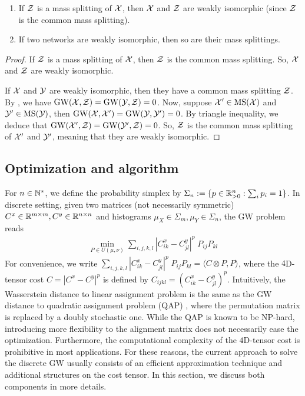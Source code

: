 \begin{corollary}
  \text{ }
\begin{enumerate}
  \item If $\mathcal Z$ is a mass splitting of $\mathcal X$, then $\mathcal X$ and $\mathcal Z$ are weakly isomorphic
  (since $\mathcal Z$ is the common mass splitting).
  \item If two networks are weakly isomorphic, then so are their mass splittings.
\end{enumerate}
\end{corollary}
\begin{proof}
  If $\mathcal Z$ is a mass splitting of $\mathcal X$, then $\mathcal Z$ is the common mass splitting.
  So, $\mathcal X$ and $\mathcal Z$ are weakly isomorphic.

  If $\mathcal X$ and $\mathcal Y$ are weakly isomorphic, then they have a common mass splitting $\mathcal Z$.
  By , we have $\text{GW}(\mathcal X, \mathcal Z) = \text{GW}(\mathcal Y, \mathcal Z) = 0$.
  Now, suppose $\mathcal X' \in \text{MS}(\mathcal X)$ and $\mathcal Y' \in \text{MS}(\mathcal Y)$, then
  $\text{GW}(\mathcal X, \mathcal X') = \text{GW}(\mathcal Y, \mathcal Y') = 0$. By triangle inequality, we deduce that
  $\text{GW}(\mathcal X', \mathcal Z) = \text{GW}(\mathcal Y', \mathcal Z) = 0$. So, $\mathcal Z$ is the common mass splitting
  of $\mathcal X'$ and $\mathcal Y'$, meaning that they are weakly isomorphic.
\end{proof}

\subsection{Optimization and algorithm}
For $n \in \mathbb N^*$, we define the probability simplex by
$\Sigma_n := \{ p \in \mathbb R^n_{> 0}: \sum_i p_i = 1 \}$.
In discrete setting, given two matrices (not necessarily symmetric)
$C^x \in \mathbb R^{m \times m}, C^y \in \mathbb R^{n \times n}$ and histograms
$\mu_X \in \Sigma_m, \mu_Y \in \Sigma_n$, the GW problem reads
\begin{align}
  \label{eq:discrete_gw}
  \min_{P \in U(\mu, \nu)} \sum_{i,j,k,l} |C^x_{ik} - C^y_{jl}|^p \; P_{ij} P_{kl}
\end{align}
For convenience, we write
$\sum_{i,j,k,l} |C^x_{ik} - C^y_{jl}|^p \; P_{ij} P_{kl} = \langle C \otimes P, P \rangle$,
where the $4$D-tensor cost $C = |C^x - C^y|^p$ is defined by $C_{ijkl} = (C^x_{ik} - C^y_{jl})^p$.
Intuitively, the Wasserstein distance to linear assignment problem is
the same as the GW distance to quadratic assignment problem (QAP) \citep{Koopmans57},
where the permutation matrix is replaced by a doubly stochastic one.
While the QAP is known to be NP-hard, introducing more flexibility to the alignment matrix
does not necessarily ease the optimization. Furthermore,
the computational complexity of the $4$D-tensor cost is prohibitive in most applications.
For these reasons, the current approach to solve the discrete GW usually consists of
an efficient approximation technique and additional structures on the cost tensor.
In this section, we discuss both components in more details.


